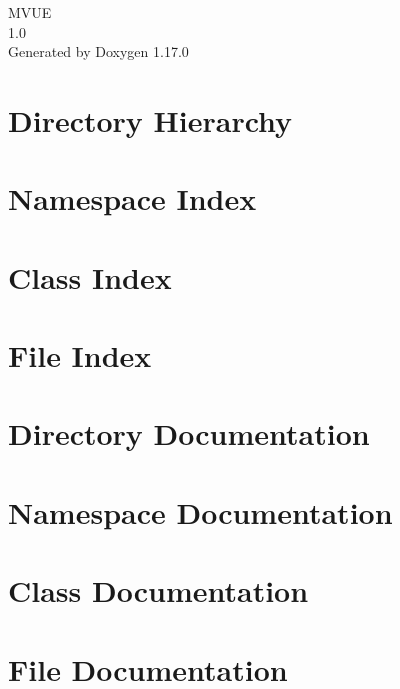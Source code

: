 \documentclass[twoside]{book}
\newcommand{\+}{\discretionary{\mbox{\scriptsize$\hookleftarrow$}}{}{}}
\newcommand{\clearemptydoublepage}{%
    \newpage{\pagestyle{empty}\cleardoublepage}%
  }
\begin{document}
  \raggedbottom
    \hypersetup{pageanchor=false,
                bookmarksnumbered=true,
                pdfencoding=unicode
               }
  \begin{titlepage}
  \vspace*{7cm}
  \begin{center}%
  {\Large MVUE}\\
  [1ex]\large 1.\+0 \\
  \vspace*{1cm}
  {\large Generated by Doxygen 1.17.0}\\
  \end{center}
  \end{titlepage}
  \clearemptydoublepage
  \tableofcontents
  \clearemptydoublepage
  \hypersetup{pageanchor=true}

\chapter{Directory Hierarchy}

\chapter{Namespace Index}

\chapter{Class Index}

\chapter{File Index}

\chapter{Directory Documentation}


\chapter{Namespace Documentation}



\chapter{Class Documentation}

\chapter{File Documentation}





  \backmatter
  \newpage
  \clearemptydoublepage
  \printindex
\end{document}
